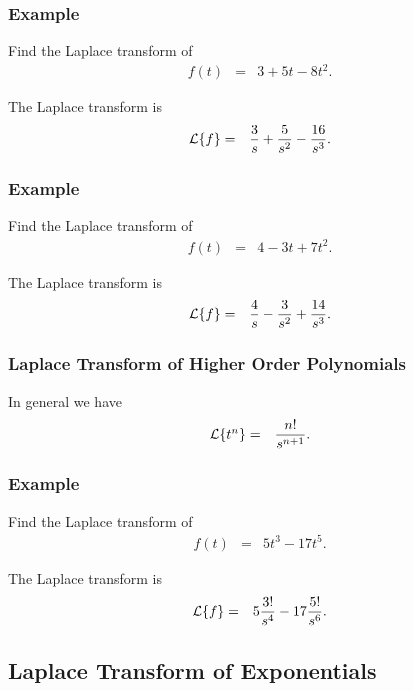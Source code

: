 \begin{frame}
  \frametitle{Example}

  Find the Laplace transform of 
  \begin{eqnarray*}
    f(t) & = & 3 + 5t - 8t^2.
  \end{eqnarray*}

  The Laplace transform is
  \begin{eqnarray*}
    \laplace{f} & = & \frac{3}{s} + \frac{5}{s^2} - \frac{16}{s^3}.
  \end{eqnarray*}

\end{frame}


\begin{frame}
  \frametitle{Example}

  Find the Laplace transform of 
  \begin{eqnarray*}
    f(t) & = & 4 - 3t + 7t^2.
  \end{eqnarray*}

  The Laplace transform is
  \begin{eqnarray*}
    \laplace{f} & = & \frac{4}{s} - \frac{3}{s^2} + \frac{14}{s^3}.
  \end{eqnarray*}

\end{frame}


\begin{frame}
  \frametitle{Laplace Transform of Higher Order Polynomials}

  In general we have
  \begin{eqnarray*}
    \laplace{t^n} & = & \frac{n!}{s^{n+1}}.
  \end{eqnarray*}

\end{frame}


\begin{frame}
  \frametitle{Example}

  Find the Laplace transform of 
  \begin{eqnarray*}
    f(t) & = & 5 t^3 - 17 t^5.
  \end{eqnarray*}

  The Laplace transform is
  \begin{eqnarray*}
    \laplace{f} & = & 5 \frac{3!}{s^4} - 17 \frac{5!}{s^6}.
  \end{eqnarray*}

\end{frame}


\subsection{Laplace Transform of Exponentials}


